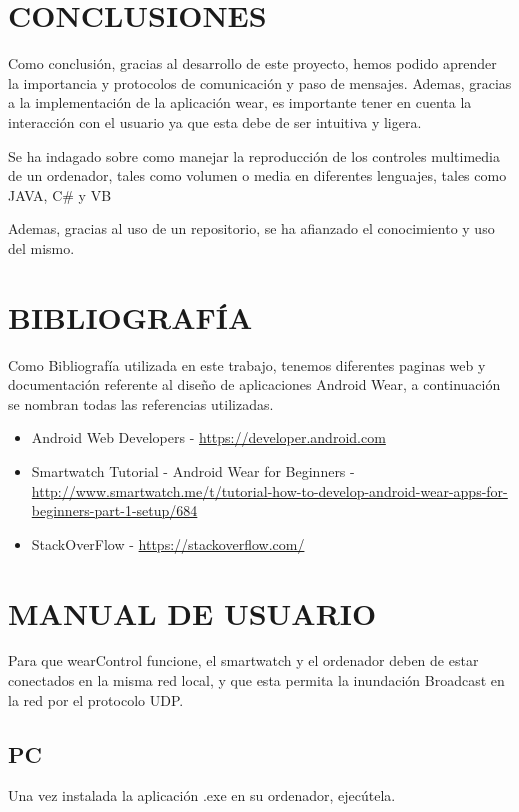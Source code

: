 \documentclass{documentation}
\begin{document}
\section{CONCLUSIONES}

Como conclusión, gracias al desarrollo de este proyecto, hemos podido aprender la importancia y protocolos de comunicación y paso de mensajes. Ademas, gracias a la implementación de la aplicación wear, es importante tener en cuenta la interacción con el usuario ya que esta debe de ser intuitiva y ligera. 

Se ha indagado sobre como manejar la reproducción de los controles multimedia de un ordenador, tales como volumen o media en diferentes lenguajes, tales como JAVA, C\# y VB

Ademas, gracias al uso de un repositorio, se ha afianzado el conocimiento y uso del mismo.
\newpage
\section{BIBLIOGRAFÍA}

Como Bibliografía utilizada en este trabajo, tenemos diferentes paginas web y documentación referente al diseño de aplicaciones Android Wear, a continuación se nombran todas las referencias utilizadas.

\begin{itemize}
\item Android Web Developers - \url{https://developer.android.com}
\item Smartwatch Tutorial - Android Wear for Beginners - \url{http://www.smartwatch.me/t/tutorial-how-to-develop-android-wear-apps-for-beginners-part-1-setup/684}
\item StackOverFlow - \url{https://stackoverflow.com/}
\end{itemize}


\section{MANUAL DE USUARIO}

Para que wearControl funcione, el smartwatch y el ordenador deben de estar conectados en la misma red local, y que esta permita la inundación Broadcast en la red por el protocolo UDP.

\subsection{PC}

Una vez instalada la aplicación .exe en su ordenador, ejecútela.
\end{document}
